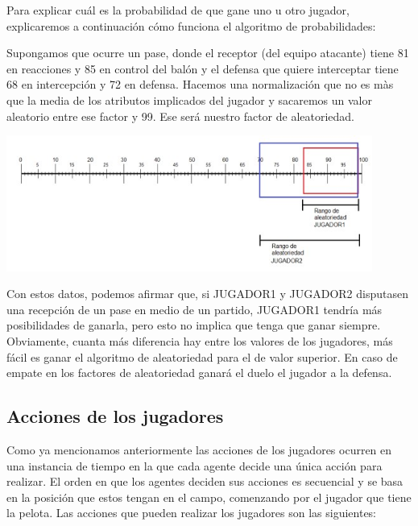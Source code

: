 \documentclass{article}
\begin{document}
Para explicar cuál es la probabilidad de que gane uno u otro jugador,
explicaremos a continuación cómo funciona el algoritmo de probabilidades:

Supongamos que ocurre un pase, donde el receptor (del equipo atacante) tiene 81 en reacciones y 85 en control del 
balón y el defensa que quiere interceptar tiene 68 en intercepción y 72 en defensa. Hacemos una normalización que 
no es màs que la media de los atributos implicados del jugador y sacaremos un valor aleatorio entre ese factor y 99. 
Ese será nuestro factor de aleatoriedad.


\includegraphics*[width=0.9\textwidth]{rank.jpg}
\bigskip

Con estos datos, podemos afirmar que, si JUGADOR1 y JUGADOR2 disputasen una recepción de un pase en medio de un 
partido, JUGADOR1 tendría más posibilidades de ganarla, pero esto no implica que tenga que ganar siempre.
Obviamente, cuanta más diferencia hay entre los valores de los jugadores, más fácil es ganar el algoritmo de 
aleatoriedad para el de valor superior. En caso de empate en los factores de aleatoriedad ganará el duelo el 
jugador a la defensa.

\subsection{Acciones de los jugadores}

Como ya mencionamos anteriormente las acciones de los jugadores ocurren en una instancia de tiempo en la que cada agente decide 
una única acción para realizar. El orden en que los agentes deciden sus acciones es secuencial y se basa en la posición que estos tengan en el campo,
comenzando por el jugador que tiene la pelota. Las acciones que pueden realizar los jugadores son las siguientes:
\end{document}
